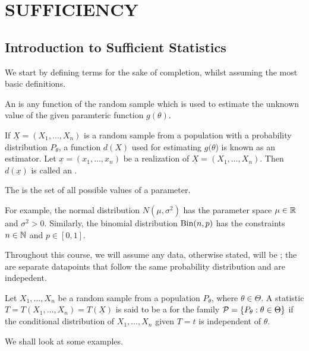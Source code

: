 \chapter{SUFFICIENCY}

\section{Introduction to Sufficient Statistics}
We start by defining terms for the sake of completion, whilst assuming the most basic definitions.
\begin{definition}
    An  is any function of the random sample which is used to estimate the unknown value of the given paramteric function $g(\theta)$.
\end{definition}
If $\underline{X} = (X_{1},\ldots,X_{n})$ is a random sample from a population with a probability distribution $P_{\theta}$, a function $d(X)$ used for estimating $g(\theta$) is known as an estimator. Let $\underline{x} = (x_{1},\ldots,x_{n})$ be a realization of $\underline{X} = (X_{1},\ldots,X_{n})$. Then $d(\underline{x})$ is called an .

\begin{definition}
    The  is the set of all possible values of a parameter.
\end{definition}

For example, the normal distribution $N(\mu,\sigma^{2})$ has the parameter space $\mu \in \mathbb{R}$ and $\sigma^{2} > 0$. Similarly, the binomial distribution $\operatorname{Bin}(n,p)$ has the constraints $n \in \mathbb{N}$ and $p \in [0,1]$.

Throughout this course, we will assume any data, otherwise stated, will be ; the are separate datapoints that follow the same probability distribution and are indepedent.

\begin{definition}
    Let $X_{1}, \ldots, X_{n}$ be a random sample from a population $P_{\theta}$, where $\theta \in \Theta$. A statistic $T = T(X_{1}, \ldots, X_{n}) = T(\underline{X})$ is said to be a  for the family $\mathcal{P} = \{P_{\theta} : \theta \in \Theta\}$ if the conditional distribution of $X_{1}, \ldots, X_{n}$ given $T = t$ is independent of $\theta$.
\end{definition}

We shall look at some examples.


